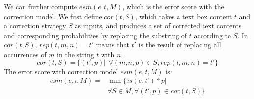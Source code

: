 We can further compute $esm(e, t, M)$,
which is the error score with the correction model. 
We first define $cor(t, S)$, 
which takes a text box content $t$ and a correction strategy $S$ as inputs, 
and produces a set of corrected text contents and 
corresponding probabilities by replacing the substring of $t$ 
according to $S$. In $cor(t, S)$, $rep(t, m, n)=t'$ means that $t'$ is the 
result of replacing all occurrences of $m$ in the string $t$ with $n$. 
\begin{equation}
cor(t, S)=\{(t',p)|~~\forall (m,n,p) \in S, rep(t,m,n)=t'\}
\end{equation}
The error score with correction model $esm(e, t, M)$ is: 
\begin{equation}
\begin{aligned}
esm(e, t, M)= & \min\{es(e, t')*p | \\
              & \forall S \in M, \forall (t', p) \in cor(t, S)\}
\end{aligned}
\end{equation}


